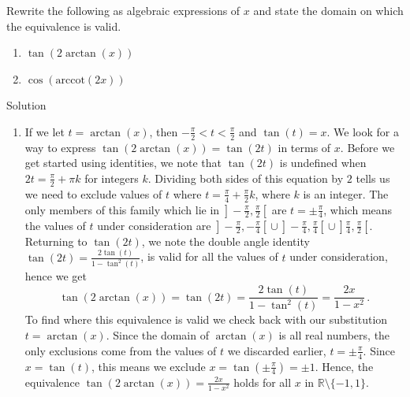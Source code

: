 \begin{example}
	Rewrite the following as algebraic expressions of $x$ and state the domain on which the equivalence is valid.
	
	\begin{multicols}{2}
		
		\begin{enumerate}
			
			\item  $\tan(2 \arctan(x))$
			
			\item  $\cos(\mbox{arccot}(2x))$ 
			
		\end{enumerate}
		
	\end{multicols}
	
	Solution 
	
	\begin{enumerate}
		
		\item If we let $t = \arctan(x)$, then $-\frac{\pi}{2} < t < \frac{\pi}{2}$ and $\tan(t) = x$.   We look for a way to express $\tan(2 \arctan(x)) = \tan(2t)$ in terms of $x$.  Before we get started using identities, we note that $\tan(2t)$ is undefined when $2t = \frac{\pi}{2} + \pi k$ for integers $k$.  Dividing both sides of this equation by $2$ tells us we need to exclude values of $t$ where $t = \frac{\pi}{4} + \frac{\pi}{2} k$, where $k$ is an integer.  The only members of this family which lie in $\left.\right]-\frac{\pi}{2}, \frac{\pi}{2}\left[\right.$ are $t = \pm \frac{\pi}{4}$, which means the values of $t$ under consideration are $\left.\right]-\frac{\pi}{2}, -\frac{\pi}{4}\left[\right. \cup \left.\right]-\frac{\pi}{4}, \frac{\pi}{4}\left[\right. \cup \left.\right]\frac{\pi}{4}, \frac{\pi}{2}\left[\right.$.  Returning to $\tan(2t)$, we note the double angle identity $\tan(2t) = \frac{2 \tan(t)}{1 - \tan^{2}(t)}$, is valid for all the values of $t$ under consideration, hence we get 
		$$
		\tan(2 \arctan(x)) = \tan(2t) = \frac{2 \tan(t)}{1 - \tan^{2}(t)}= \frac{2x}{1-x^2}\,.
		$$
		To find where this equivalence is valid we check back with our substitution $t = \arctan(x)$. Since the domain of $\arctan(x)$ is all real numbers, the only exclusions come from the values of $t$ we discarded earlier, $t = \pm \frac{\pi}{4}$.   Since $x =\tan(t)$, this means we exclude $x = \tan\left(\pm \frac{\pi}{4}\right) = \pm 1$.  Hence, the equivalence  $\tan(2 \arctan(x)) =  \frac{2x}{1-x^2}$ holds for all $x$ in $\mathbb{R}\setminus\{-1,1\}$.
		

\end{enumerate}
\end{example}
